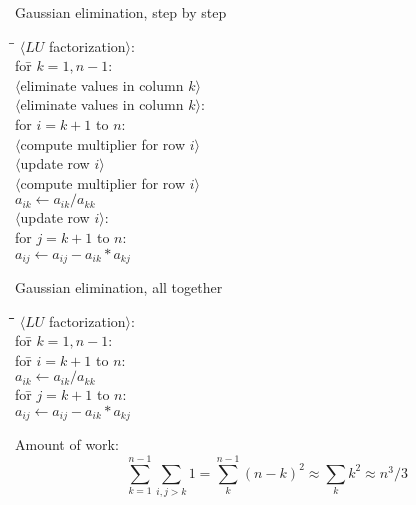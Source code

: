 \newcommand\macro[1]{$\langle$#1$\rangle$} %
\begin{frame}{Gaussian elimination, step by step}
\begin{tabbing}
  \kern20pt\=\kern10pt\=\kill
  \macro{$LU$ factorization}:\\
  \>for\={} $k=1,n-1$:\\
  \>\>\macro{eliminate values in column $k$}\\ [5pt]
  \macro{eliminate values in column $k$}:\\
  \>for $i=k+1$ to $n$:\\
  \>\>\macro{compute multiplier for row $i$}\\
  \>\>\macro{update row $i$}\\ [5pt]
  \macro{compute multiplier for row $i$}\\
  \> $a_{ik}\leftarrow a_{ik}/a_{kk}$\\ [5pt]
  \macro{update row $i$}:\\
  \>for $j=k+1$ to $n$:\\
  \>\>$a_{ij}\leftarrow a_{ij}-a_{ik}*a_{kj}$
\end{tabbing}
\end{frame}

\begin{frame}{Gaussian elimination, all together}
\begin{tabbing}
  \kern20pt\=\kern10pt\=\kern10pt\=\kern10pt\=\kill
  \macro{$LU$ factorization}:\\
  \>for\={} $k=1,n-1$:\\
  \>\>for\={} $i=k+1$ to $n$:\\
  \>\>\> $a_{ik}\leftarrow a_{ik}/a_{kk}$\\
  \>\>\>for\={} $j=k+1$ to $n$:\\
  \>\>\>\>$a_{ij}\leftarrow a_{ij}-a_{ik}*a_{kj}$
\end{tabbing}
Amount of work:
\[ \sum_{k=1}^{n-1}\sum_{i,j>k} 1 =
\sum_k^{n-1} (n-k)^2
\approx \sum_k k^2 \approx n^3/3 \]
\end{frame}


